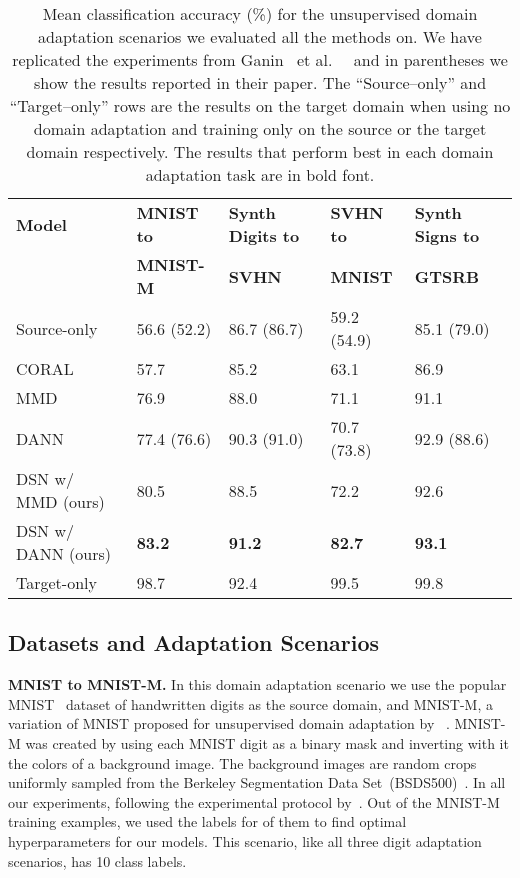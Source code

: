 \documentclass{article}
\newcommand{\etal}{~et al.~}
\begin{document}
\begin{table}[t]
\centering
\caption{Mean classification accuracy (\%) for the unsupervised domain adaptation scenarios we evaluated all the methods on. We have replicated the experiments from Ganin \etal~\protect\cite{ganin2016domain} and in parentheses we show the results reported in their paper. The ``Source--only'' and ``Target--only'' rows are the results on the target domain when  using no domain adaptation and training only on the source or the target domain respectively. The results that perform best in each domain adaptation task are in bold font.}
\vspace{2mm}
\label{tab:results}
\begin{tabular}{ | l | l | l | l | l | }
\hline
\bf Model   & \bf MNIST to & \bf Synth Digits to &\bf SVHN to  &\bf Synth Signs to \\
 &\bf MNIST-M  &\bf SVHN        &\bf MNIST &\bf GTSRB     \\ \hline \hline
Source-only  & 56.6 (52.2) & 86.7 (86.7)      & 59.2 (54.9) & 85.1  (79.0)    \\ \hline \hline
CORAL \cite{sun2015return} & 57.7 & 85.2       &  63.1     & 86.9        \\ \hline
MMD  \cite{tzeng2015ddc,long2015learning}  & 76.9 & 88.0 & 71.1 & 91.1 \\ \hline 
DANN \cite{ganin2016domain}  & 77.4 (76.6)  &  90.3 (91.0)    & 70.7 (73.8)  &     92.9 (88.6) \\ \hline
DSN w/ MMD (ours)  & 80.5 & 88.5  & 72.2   & 92.6 \\ \hline
DSN w/ DANN (ours) & \textbf{83.2} & \textbf{91.2} & \textbf{82.7} & \textbf{93.1} \\ \hline\hline
Target-only  & 98.7 & 92.4  & 99.5 & 99.8  \\ \hline
\end{tabular}
\end{table}



\subsection{Datasets and Adaptation Scenarios}
\textbf{MNIST to MNIST-M.} In this domain adaptation scenario we use the popular MNIST~\cite{lecun1998gradient} dataset of handwritten digits as the source domain, and MNIST-M, a variation of MNIST proposed for unsupervised domain adaptation by ~\cite{ganin2016domain}. MNIST-M was created by using each MNIST digit as a binary mask and inverting with it the colors of a background image. The background images are random crops uniformly sampled from the Berkeley Segmentation Data Set~(BSDS500)~\cite{arbelaez2011contour}.  In all our experiments, following the experimental protocol by~\cite{ganin2016domain}. Out of the  MNIST-M training examples, we used the labels for  of them to find optimal hyperparameters for our models. This scenario, like all three digit adaptation scenarios, has 10 class labels.
\end{document}
